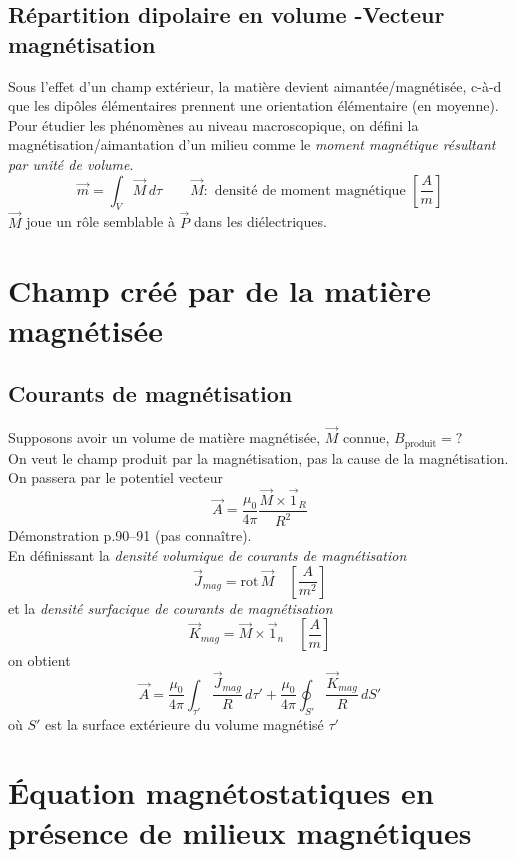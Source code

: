 \documentclass	[11pt, a4paper, openany]{book}
\newcommand{\rot}{\text{rot}\,}
\begin{document}
\subsection{Répartition dipolaire en volume -Vecteur magnétisation}
Sous l'effet d'un champ extérieur, la matière devient aimantée/magnétisée, c-à-d que les dipôles élémentaires prennent une orientation élémentaire (en moyenne). Pour étudier les phénomènes au niveau macroscopique, on défini la magnétisation/aimantation d'un milieu comme le \textit{moment magnétique résultant par unité de volume}. 
\begin{equation}\label{eq:def m}
\vec m=\int_V\vec M\,d\tau\qquad\vec M :\text{ densité de moment magnétique }\left[\frac{A}{m}\right]
\end{equation}
$\vec M$ joue un rôle semblable à $\vec P$ dans les diélectriques.
\section{Champ créé par de la matière magnétisée}
\subsection{Courants de magnétisation}
Supposons avoir un volume de matière magnétisée, $\vec M$ connue, $B_{\text{produit}}=?$\\
On veut le champ produit par la magnétisation, pas la cause de la magnétisation. On passera par le potentiel vecteur \begin{equation}
\vec A=\frac{\mu_0}{4\pi}\frac{\vec M\times \vec 1_R}{R^2}
\end{equation}
Démonstration p.90--91 (pas connaître).\\
En définissant la \textit{densité volumique de courants de magnétisation} \begin{equation}
\vec J_{mag}=\rot\vec M\quad\left[\frac{A}{m^2}\right]
\end{equation}
et la \textit{densité surfacique de courants de magnétisation}
\begin{equation}
\vec K_{mag}=\vec M\times\vec 1_n\quad\left[\frac{A}{m}\right]
\end{equation}
on obtient
\begin{equation}
\vec A=\frac{\mu_0}{4\pi}\int_{\tau'}\frac{\vec J_{mag}}{R}\,d\tau'+\frac{\mu_0}{4\pi}\oint_{S'}\frac{\vec K_{mag}}{R}\,dS'
\end{equation}
où $S'$ est la surface extérieure du volume magnétisé $\tau'$
\section{Équation magnétostatiques en présence de milieux magnétiques}
\end{document}
